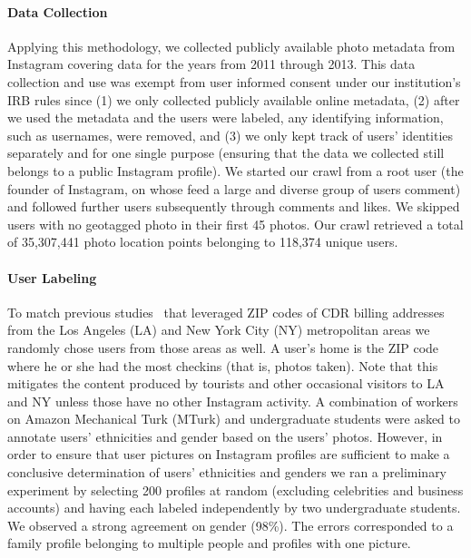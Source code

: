 \paragraph{Data Collection} 
Applying this methodology, we collected publicly available photo metadata from Instagram covering data for the years from 2011 through 2013. This data collection and use was exempt from user informed consent under our institution's IRB rules since (1) we only collected publicly available online metadata, (2) after we used the metadata and the users were labeled, any identifying information, such as usernames, were removed, and (3) we only kept track of users' identities separately and for one single purpose (ensuring that the data we collected still belongs to a public Instagram  profile). We started our crawl from a root user (the founder of Instagram, on whose feed a large and diverse group of users comment) and followed further users subsequently through comments and likes. We skipped users with no geotagged photo in their first 45 photos. Our crawl retrieved a total of 35,307,441 photo location points belonging to 118,374 unique users.

\paragraph{User Labeling} 
To match previous studies~\cite{Isaacman:2011un,Isaacman:2011cn,Isaacman:2010en} that leveraged ZIP codes of CDR billing addresses from the Los Angeles (LA) and New York City (NY) metropolitan areas we randomly chose users from those areas as well. A user's home is the ZIP code where he or she had the most checkins (that is, photos taken). Note that this mitigates the content produced by tourists and other occasional visitors to LA and NY unless those have no other Instagram activity. A combination of workers on Amazon Mechanical Turk (MTurk) and undergraduate students were asked to annotate users' ethnicities and gender based on the users' photos. However, in order to ensure that user pictures on Instagram profiles are sufficient to make a conclusive determination of users' ethnicities and genders we ran a preliminary experiment by selecting 200 profiles at random (excluding celebrities and business accounts) and having each labeled independently by two undergraduate students. We observed a strong agreement on gender (98\%). The errors corresponded to a family profile belonging to multiple people and profiles with one picture.

